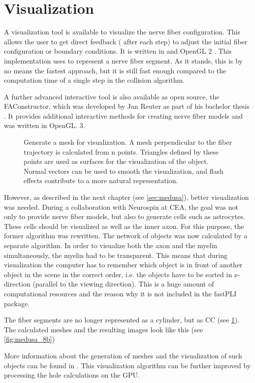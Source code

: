 \section{Visualization}\label{sec:visualization}
%
A visualization tool is available to visualize the nerve fiber configuration.
This allows the user to get direct feedback (\eg{} after each step) to adjust the initial fiber configuration or boundary conditions.
It is written in \cpp{} and \ac{OpenGL} 2 \cite{isocpp, khronos}.
This implementation uses  to represent a nerve fiber segment.
As it stands, this is by no means the fastest approach, but it is still fast enough compared to the computation time of a single step in the collision algorithm.
\par
% 
A further advanced interactive tool is also available as open source, the FAConstructor, which was developed by Jan Reuter as part of his bachelor thesis \cite{Reuter2019}.
It provides additional interactive methods for creating nerve fiber models and was written in \ac{OpenGL}. 3.
\par
%
%
\begin{figure}[!t]
    \centering
    \setlength{\tikzwidth}{0.75\textwidth}
	\caption{Generate a mesh for visualization. A mesh perpendicular to the fiber trajectory is calculated from n points. Triangles defined by these points are used as surfaces for the visualization of the object. Normal vectors can be used to smooth the visualization, and flash effects contribute to a more natural representation.}
	\label{fig:vis_mesh}
\end{figure}
%
However, as described in the next chapter (see \cref{sec:medusa}), better visualization was needed.
During a collaboration with Neurospin at \ac{CEA}, the goal was not only to provide nerve fiber models, but also to generate cells such as astrocytes.
These cells should be visualized as well as the inner axon.
For this purpose, the former algorithm was rewritten.
The network of objects was now calculated by a separate algorithm.
In order to visualize both the axon and the myelin simultaneously, the myelin had to be transparent.
This means that during visualization the computer has to remember which object is in front of another object in the scene in the correct order, i.e. the objects have to be sorted in z-direction (parallel to the viewing direction).
This is a huge amount of computational resources and the reason why it is not included in the \ac{fastPLI} package.
\par
% 
The fiber segments are no longer represented as a cylinder, but as \ac{CC} (see \cref{fig:vis_mesh}).
The calculated meshes and the resulting images look like this (see \cref{fig:medusa_8b})
\par
% 
More information about the generation of meshes and the visualization of such objects can be found in \cite{9780134495491}.
This visualization algorithm can be further improved by processing the hole calculations on the \ac{GPU}.
%
% 
% 
